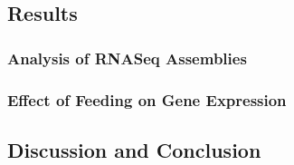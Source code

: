 \subsection{Results}

\subsubsection{Analysis of RNASeq Assemblies}

\subsubsection{Effect of Feeding on Gene Expression}

\subsection{Discussion and Conclusion}